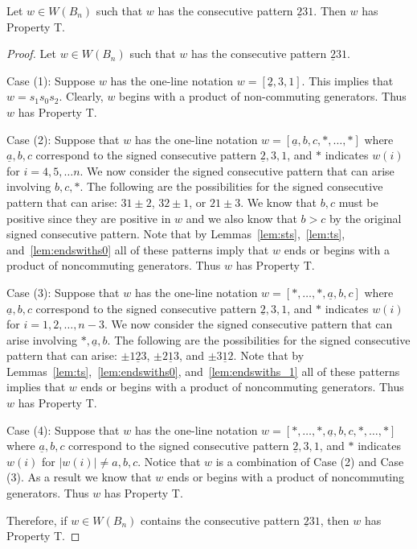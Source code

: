 \begin{lemma}\label{lem:231}
Let $w \in W(B_n)$ such that $w$ has the consecutive pattern $\underline{2}31$. Then $w$ has Property T.
\begin{proof}
	Let $w \in W(B_n)$ such that $w$ has the consecutive pattern $\underline{2}31$.
	
	Case (1): Suppose $w$ has the one-line notation $w=[\underline{2},3,1]$. This implies that $w=s_1s_0s_2$. Clearly, $w$ begins with a product of non-commuting generators. Thus $w$ has Property T.
	
	Case (2): Suppose that $w$ has the one-line notation $w=[\underline{a},b,c, \ast, \ldots, \ast]$ where $\underline{a},b,c$ correspond to the signed consecutive pattern $\underline{2},3,1$, and $\ast$ indicates $w(i)$ for $i=4,5, \ldots n$. We now consider the signed consecutive pattern that can arise involving $b,c, \ast$. The following are the possibilities for the signed consecutive pattern that can arise: $31\pm2$, $32 \pm1$, or $21\pm3$. We know that $b,c$ must be positive since they are positive in $w$ and we also know that $b>c$ by the original signed consecutive pattern. Note that by Lemmas~\ref{lem:sts},~\ref{lem:ts}, and~\ref{lem:endswiths0} all of these patterns imply that $w$ ends or begins with a product of noncommuting generators. Thus $w$ has Property T.
	
	Case (3): Suppose that $w$ has the one-line notation $w=[\ast, \ldots, \ast, \underline{a},b,c]$ where $\underline{a},b,c$ correspond to the signed consecutive pattern $\underline{2},3,1$, and $\ast$ indicates $w(i)$ for $i=1,2, \ldots ,n-3$. We now consider the signed consecutive pattern that can arise involving $\ast, \underline{a}, b$. The following are the possibilities for the signed consecutive pattern that can arise: $\pm1 \underline{2} 3$, $\pm 2 \underline{1} 3$, and $\pm 3 \underline{1} 2$. Note that by Lemmas~\ref{lem:ts},~\ref{lem:endswiths0}, and~\ref{lem:endswiths_1} all of these patterns implies that $w$ ends or begins with a product of noncommuting generators. Thus $w$ has Property T. 
	
	Case (4): Suppose that $w$ has the one-line notation $w=[\ast, \ldots, \ast, \underline{a},b,c, \ast, \ldots, \ast]$ where $\underline{a},b,c$ correspond to the signed consecutive pattern $\underline{2},3,1$, and $\ast$ indicates $w(i)$ for $|w(i)|\neq a,b,c$. Notice that $w$ is a combination of Case (2) and Case (3). As a result we know that $w$ ends or begins with a product of noncommuting generators. Thus $w$ has Property T.

	Therefore, if $w \in W(B_n)$ contains the consecutive pattern $\underline{2}31$, then $w$ has Property T.
\end{proof}	
\end{lemma}

